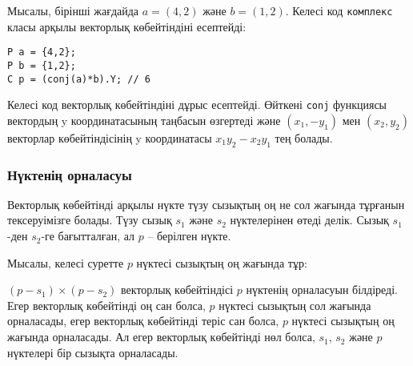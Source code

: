 \noindent
Мысалы, бірінші жағдайда
$a=(4,2)$ және $b=(1,2)$.
Келесі код \texttt{комплекс} класы арқылы
векторлық көбейтіндіні есептейді:

\begin{lstlisting}
P a = {4,2};
P b = {1,2};
C p = (conj(a)*b).Y; // 6
\end{lstlisting}

Келесі код векторлық көбейтіндіні дұрыс есептейді.
Өйткені \texttt{conj} функциясы вектордың y координатасының 
таңбасын өзгертеді және $(x_1,-y_1)$ мен $(x_2,y_2)$ векторлар
көбейтіндісінің y координатасы $x_1 y_2 - x_2 y_1$ тең болады. 


\subsubsection{Нүктенің орналасуы}

Векторлық көбейтінді арқылы нүкте түзу сызықтың 
оң не сол жағында тұрғанын тексеруімізге болады. Түзу сызық
$s_1$ және $s_2$ нүктелерінен өтеді делік. Сызық
$s_1$-ден $s_2$-ге бағытталған, ал $p$ -- берілген нүкте. 


Мысалы, келесі суретте $p$ нүктесі сызықтың оң жағында
тұр:
\begin{center}
\end{center}

$(p-s_1) \times (p-s_2)$ векторлық көбейтіндісі
$p$ нүктенің орналасуын білдіреді. Егер векторлық көбейтінді 
оң сан болса, $p$ нүктесі сызықтың сол жағында орналасады, егер
векторлық көбейтінді теріс сан болса, $p$ нүктесі сызықтың оң
жағында орналасады. Ал егер векторлық көбейтінді нөл болса,
$s_1$, $s_2$ және $p$ нүктелері бір сызықта орналасады. 

